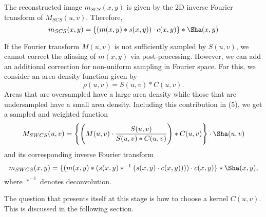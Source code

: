 \documentclass[11pt]{article}
\begin{document}
The reconstructed image $m_{SCS}(x,y)$ is given by the 2D inverse Fourier transform of $M_{SCS}(u,v)$. Therefore,
\begin{equation}
m_{SCS}(x,y) = \{(m(x,y) \ast s(x,y)) \cdot c(x,y)\} \ast \Sha(x,y)
\end{equation}

If the Fourier transform $M(u,v)$ is not sufficiently sampled by $S(u,v)$, we cannot correct the aliasing of $m(x,y)$ via post-processing. However, we can add an additional correction for non-uniform sampling in Fourier space. For this, we consider an area density function given by
\begin{equation}
\rho(u,v) = S(u,v) \ast C(u,v).
\end{equation}
Areas that are oversampled have a large area density while those that are undersampled have a small area density. Including this contribution in (5), we get a sampled and weighted function
\begin{equation}
M_{SWCS}(u,v) = \Bigg\{\Bigg(M(u,v) \cdot \frac{S(u,v)}{S(u,v) \ast C(u,v)}\Bigg) \ast C(u,v)\Bigg\} \cdot \Sha(u,v)
\end{equation}
and its corresponding inverse Fourier transform
\begin{equation}
m_{SWCS}(x,y) =  \{(m(x,y) \ast (s(x,y) \ast^{-1} (s(x,y) \cdot c(x,y)))) \cdot c(x,y)\} \ast \Sha(x,y),
\end{equation}
where $\ast^{-1}$ denotes deconvolution.

The question that presents itself at this stage is how to choose a kernel $C(u,v)$. This is discussed in the following section.
\end{document}
